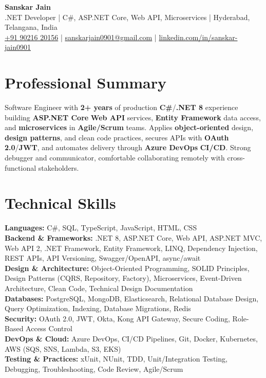 \documentclass[a4paper,10pt]{article}
\begin{document}
\begin{center}
    {\LARGE \textbf{Sanskar Jain}} \\
    \vspace{2pt}
    .NET Developer \;|\; C\#, ASP.NET Core, Web API, Microservices \;|\; Hyderabad, Telangana, India \\
    \href{tel:+919021620156}{+91 90216 20156} \;|\;
    \href{mailto:sanskarjain0901@gmail.com}{sanskarjain0901@gmail.com} \;|\;
    \href{https://www.linkedin.com/in/sanskar-jain0901/}{linkedin.com/in/sanskar-jain0901}
\end{center}

\section*{Professional Summary}
Software Engineer with \textbf{2+ years} of production \textbf{C\#}/\textbf{.NET 8} experience building \textbf{ASP.NET Core} \textbf{Web API} services, \textbf{Entity Framework} data access, and \textbf{microservices} in \textbf{Agile/Scrum} teams.
Applies \textbf{object-oriented} design, \textbf{design patterns}, and clean code practices, secures APIs with \textbf{OAuth 2.0}/\textbf{JWT}, and automates delivery through \textbf{Azure DevOps} \textbf{CI/CD}. Strong debugger and communicator, comfortable collaborating remotely with cross-functional stakeholders.

\section*{Technical Skills}
\begin{sloppypar}
\noindent
\textbf{Languages:} C\#, SQL, TypeScript, JavaScript, HTML, CSS \\
\textbf{Backend \& Frameworks:} .NET 8, ASP.NET Core, Web API, ASP.NET MVC, Web API 2, .NET Framework, Entity Framework, LINQ, Dependency Injection, REST APIs, API Versioning, Swagger/OpenAPI, async/await \\
\textbf{Design \& Architecture:} Object-Oriented Programming, SOLID Principles, Design Patterns (CQRS, Repository, Factory), Microservices, Event-Driven Architecture, Clean Code, Technical Design Documentation \\
\textbf{Databases:} PostgreSQL, MongoDB, Elasticsearch, Relational Database Design, Query Optimization, Indexing, Database Migrations, Redis \\
\textbf{Security:} OAuth 2.0, JWT, Okta, Kong API Gateway, Secure Coding, Role-Based Access Control \\
\textbf{DevOps \& Cloud:} Azure DevOps, CI/CD Pipelines, Git, Docker, Kubernetes, AWS (SQS, SNS, Lambda, S3, EKS) \\
\textbf{Testing \& Practices:} xUnit, NUnit, TDD, Unit/Integration Testing, Debugging, Troubleshooting, Code Review, Agile/Scrum
\end{sloppypar}
\end{document}
